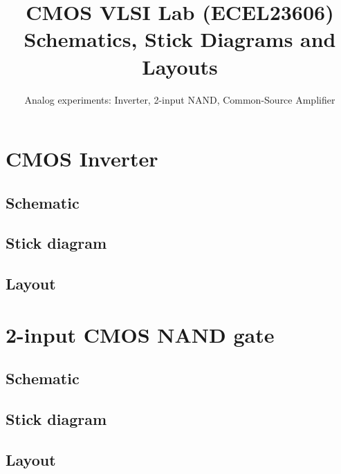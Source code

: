 \documentclass[11pt]{article}
\title{CMOS VLSI Lab (ECEL23606)\\ Schematics, Stick Diagrams and Layouts}
\author{Analog experiments: Inverter, 2-input NAND, Common-Source Amplifier}
\date{}
\begin{document}
\maketitle

\section{CMOS Inverter}
\subsection*{Schematic}
\begin{center}\end{center}
\subsection*{Stick diagram}
\begin{center}\end{center}
\subsection*{Layout}
\begin{center}\end{center}

\clearpage
\section{2-input CMOS NAND gate}
\subsection*{Schematic}
\begin{center}\end{center}
\subsection*{Stick diagram}
\begin{center}\end{center}
\subsection*{Layout}
\begin{center}\end{center}
\end{document}
